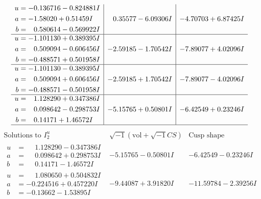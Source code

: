 \documentclass[1p]{elsarticle_modified}
\theoremstyle{definition}
\newcommand{\I}{\sqrt{-1}}
\begin{document}
$$\begin{array}{c|c|c}
\begin{aligned}
u &= -0.136716 - 0.824881 I \\
a &= -1.58020 + 0.51459 I \\
b &= \phantom{-}0.580614 - 0.569922 I\end{aligned}
 & \phantom{-}0.35577 - 6.09306 I & -4.70703 + 6.87425 I \\ \hline\begin{aligned}
u &= -1.101130 + 0.389395 I \\
a &= \phantom{-}0.509094 - 0.606456 I \\
b &= -0.488571 + 0.501958 I\end{aligned}
 & -2.59185 - 1.70542 I & -7.89077 + 4.02096 I \\ \hline\begin{aligned}
u &= -1.101130 - 0.389395 I \\
a &= \phantom{-}0.509094 + 0.606456 I \\
b &= -0.488571 - 0.501958 I\end{aligned}
 & -2.59185 + 1.70542 I & -7.89077 - 4.02096 I \\ \hline\begin{aligned}
u &= \phantom{-}1.128290 + 0.347386 I \\
a &= \phantom{-}0.098642 - 0.298753 I \\
b &= \phantom{-}0.14171 + 1.46572 I\end{aligned}
 & -5.15765 + 0.50801 I & -6.42549 + 0.23246 I\\
 \hline 
 \end{array}$$\newpage$$\begin{array}{c|c|c}  
\text{Solutions to }I^u_{2}& \I (\text{vol} + \sqrt{-1}CS) & \text{Cusp shape}\\
 \hline 
\begin{aligned}
u &= \phantom{-}1.128290 - 0.347386 I \\
a &= \phantom{-}0.098642 + 0.298753 I \\
b &= \phantom{-}0.14171 - 1.46572 I\end{aligned}
 & -5.15765 - 0.50801 I & -6.42549 - 0.23246 I \\ \hline\begin{aligned}
u &= \phantom{-}1.080650 + 0.504832 I \\
a &= -0.224516 + 0.457220 I \\
b &= -0.13662 - 1.53895 I\end{aligned}
 & -9.44087 + 3.91820 I & -11.59784 - 2.39256 I \\ \hline\begin{aligned}

\end{aligned}
\end{array}$$
\end{document}
